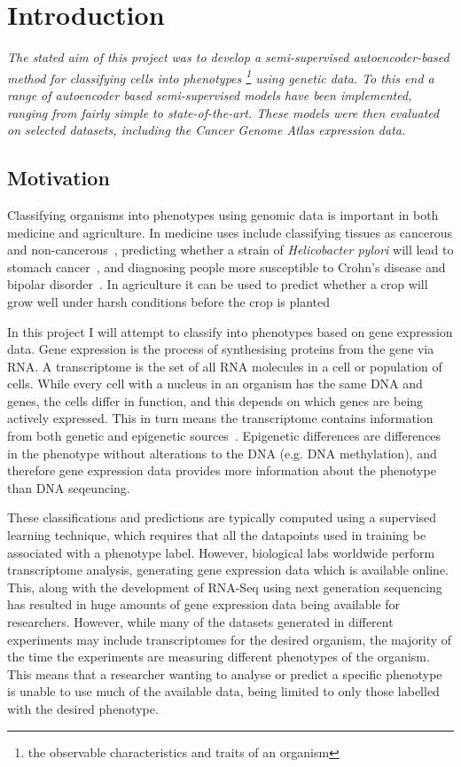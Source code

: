 \chapter{Introduction}

\textit{The stated aim of this project was to develop a semi-supervised autoencoder-based method for classifying 
cells into phenotypes \footnote{the observable characteristics and traits of an organism} using genetic data. To this end a range 
of autoencoder based semi-supervised models have been implemented, 
ranging from fairly simple to state-of-the-art. These models were then evaluated on selected datasets, including 
the Cancer Genome Atlas expression data.}

\section{Motivation}

Classifying organisms into phenotypes using genomic data is important in both medicine and agriculture. In medicine uses include 
classifying tissues as cancerous and non-cancerous~\cite{Li2017}, predicting whether a strain of \textit{Helicobacter pylori} will lead to 
stomach cancer~\cite{helicobacter}, and diagnosing people more susceptible to Crohn's disease and bipolar disorder~\cite{doi:10.1002/humu.23280}.
In agriculture it can be used to predict whether a crop will grow well under harsh conditions before the crop is planted~\cite{cimmyt}

In this project I will attempt to classify into phenotypes based on gene expression data. Gene expression is the process of synthesising 
proteins from the gene via RNA. A transcriptome is the set of all RNA 
molecules in a cell or population of cells. While every cell with a nucleus in an organism has the same DNA and genes, the cells
differ in function, and this depends on which genes are being actively expressed. This in turn means the
transcriptome contains information from both genetic and epigenetic sources~\cite{Gibney2010}. Epigenetic differences are differences
in the phenotype without alterations to the DNA (e.g. DNA methylation), and therefore gene expression data provides more information about 
the phenotype than DNA seqeuncing.

These classifications and predictions are typically computed using a supervised learning technique, which requires that all the 
datapoints used in training be associated with a phenotype label. However, biological labs worldwide perform transcriptome analysis, 
generating gene expression data 
which is available online. This, along with the development
of RNA-Seq using next generation sequencing has resulted in huge amounts of gene expression data being available for researchers. However,
while many of the datasets generated in different experiments may include transcriptomes for the desired organism,
the majority of the time the experiments are measuring different phenotypes of the organism. This means that a 
researcher wanting to analyse or predict a specific phenotype is unable to use much of the available data, being limited
to only those labelled with the desired phenotype.

